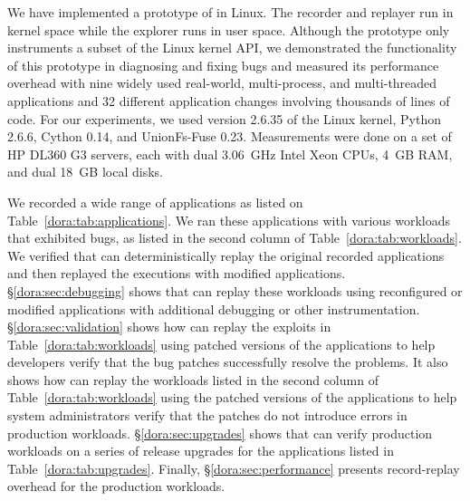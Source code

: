 
We have implemented a prototype of {\dora} in Linux. The recorder and
replayer run in kernel space while the explorer runs in user space.
Although the prototype only instruments a subset of the Linux kernel API, we
demonstrated the functionality of this prototype in diagnosing
and fixing bugs and measured its performance overhead with nine
widely used real-world, multi-process, and multi-threaded applications
and 32 different application changes involving thousands of lines of code.
For our experiments, we used version 2.6.35 of the Linux kernel,
Python 2.6.6, Cython 0.14, and UnionFs-Fuse 0.23.
Measurements were done on a set of HP DL360 G3 servers, each with dual
3.06~GHz Intel Xeon CPUs, 4~GB RAM, and dual 18~GB local disks.

We recorded a wide range of applications as listed on Table~\ref{dora:tab:applications}.
We ran these applications with various workloads that exhibited
bugs, as listed in the second column of Table~\ref{dora:tab:workloads}.
We verified that {\dora} can
deterministically replay the original recorded applications and then
replayed the executions with modified applications.
\S\ref{dora:sec:debugging} shows that
{\dora} can replay these workloads using reconfigured or
modified applications with additional debugging or other
instrumentation. \S\ref{dora:sec:validation} shows
how {\dora} can replay the exploits in Table~\ref{dora:tab:workloads}
using patched versions of the applications to help developers
verify that the bug patches successfully resolve the problems.
It also shows how {\dora} can
replay the workloads listed in the second column of
Table~\ref{dora:tab:workloads} using the patched versions of the
applications to help system administrators verify that the patches
do not introduce errors in production workloads.
\S\ref{dora:sec:upgrades} shows that {\dora} can
verify production workloads on a series of release upgrades for the
applications listed in Table~\ref{dora:tab:upgrades}.
Finally, \S\ref{dora:sec:performance} presents record-replay
overhead for the production workloads.


